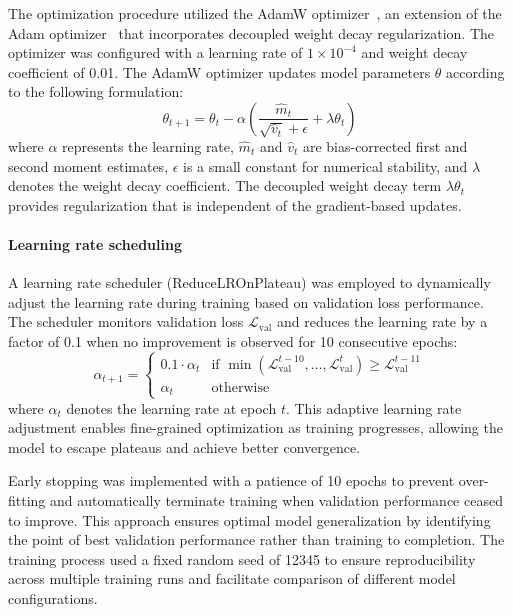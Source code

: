 \documentclass[pdflatex,sn-nature]{sn-jnl}%
\theoremstyle{thmstyleone}%
\theoremstyle{thmstyletwo}%
\theoremstyle{thmstylethree}%
\begin{document}
The optimization procedure utilized the AdamW optimizer~\cite{adamw}, an extension of the Adam optimizer~\cite{kingma2014adam} that incorporates decoupled weight decay regularization.
The optimizer was configured with a learning rate of $1\times10^{-4}$ and weight decay coefficient of 0.01.
The AdamW optimizer updates model parameters $\theta$ according to the following formulation:
$$
	\theta_{t+1} = \theta_t - \alpha \left( \frac{\hat{m}_t}{\sqrt{\hat{v}_t} + \epsilon} + \lambda \theta_t \right)
$$
where $\alpha$ represents the learning rate, $\hat{m}_t$ and $\hat{v}_t$ are bias-corrected first and second moment estimates, $\epsilon$ is a small constant for numerical stability, and $\lambda$ denotes the weight decay coefficient.
The decoupled weight decay term $\lambda \theta_t$ provides regularization that is independent of the gradient-based updates.

\paragraph{Learning rate scheduling}
A learning rate scheduler (ReduceLROnPlateau) was employed to dynamically adjust the learning rate during training based on validation loss performance.
The scheduler monitors validation loss $\mathcal{L}_{\text{val}}$ and reduces the learning rate by a factor of 0.1 when no improvement is observed for 10 consecutive epochs:
$$
	\alpha_{t+1} = \begin{cases}
		0.1 \cdot \alpha_t & \text{if } \min(\mathcal{L}_{\text{val}}^{t-10}, \ldots, \mathcal{L}_{\text{val}}^{t}) \geq \mathcal{L}_{\text{val}}^{t-11} \\
		\alpha_t           & \text{otherwise}
	\end{cases}
$$
where $\alpha_t$ denotes the learning rate at epoch $t$.
This adaptive learning rate adjustment enables fine-grained optimization as training progresses, allowing the model to escape plateaus and achieve better convergence.

Early stopping was implemented with a patience of 10 epochs to prevent over-fitting and automatically terminate training when validation performance ceased to improve.
This approach ensures optimal model generalization by identifying the point of best validation performance rather than training to completion.
The training process used a fixed random seed of 12345 to ensure reproducibility across multiple training runs and facilitate comparison of different model configurations.
\end{document}
